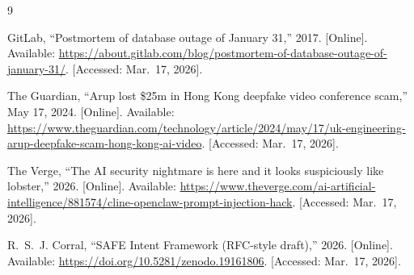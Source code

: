 \documentclass[11pt]{article}
\begin{document}
\begin{thebibliography}{9}

GitLab, ``Postmortem of database outage of January 31,'' 2017. [Online].
Available: \url{https://about.gitlab.com/blog/postmortem-of-database-outage-of-january-31/}.
[Accessed: Mar.\ 17, 2026].

The Guardian, ``Arup lost \$25m in Hong Kong deepfake video conference scam,''
May 17, 2024. [Online].
Available: \url{https://www.theguardian.com/technology/article/2024/may/17/uk-engineering-arup-deepfake-scam-hong-kong-ai-video}.
[Accessed: Mar.\ 17, 2026].

The Verge, ``The AI security nightmare is here and it looks suspiciously like lobster,''
2026. [Online].
Available: \url{https://www.theverge.com/ai-artificial-intelligence/881574/cline-openclaw-prompt-injection-hack}.
[Accessed: Mar.\ 17, 2026].

R.~S.~J. Corral, ``SAFE Intent Framework (RFC-style draft),'' 2026. [Online].
Available: \url{https://doi.org/10.5281/zenodo.19161806}.
[Accessed: Mar.\ 17, 2026].

\end{thebibliography}
\end{document}
